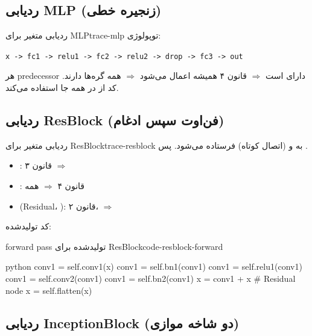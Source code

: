 \documentclass{nngraph-fa}
\begin{document}
\subsection{ردیابی MLP (زنجیره خطی)}

\begin{exbox}{ردیابی متغیر برای MLP}{trace-mlp}
توپولوژی:
\begin{latin}
\texttt{x -> fc1 -> relu1 -> fc2 -> relu2 -> drop -> fc3 -> out}
\end{latin}

هر predecessor دارای  است $\Rightarrow$ قانون ۴
همیشه اعمال می‌شود $\Rightarrow$ همه گره‌ها  دارند.
کد  از  در همه جا استفاده می‌کند.
\end{exbox}

\subsection{ردیابی ResBlock (فن‌اوت سپس ادغام)}

\begin{exbox}{ردیابی متغیر برای ResBlock}{trace-resblock}
 به  و  (اتصال کوتاه) فرستاده می‌شود.
پس .

\begin{itemize}
    \item {}: قانون ۳ $\Rightarrow$ 
    \item {}: قانون ۴ $\Rightarrow$ همه 
    \item {} (Residual، ): قانون ۲،
     $\Rightarrow$ 
\end{itemize}

کد تولیدشده:
\begin{codebox}{forward pass تولیدشده برای ResBlock}{code-resblock-forward}
\begin{amzcode}{python}
conv1 = self.conv1(x)
conv1 = self.bn1(conv1)
conv1 = self.relu1(conv1)
conv1 = self.conv2(conv1)
conv1 = self.bn2(conv1)
x     = conv1 + x       # Residual node
x     = self.flatten(x)
\end{amzcode}
\end{codebox}
\end{exbox}

\subsection{ردیابی InceptionBlock (دو شاخه موازی)}
\end{document}

